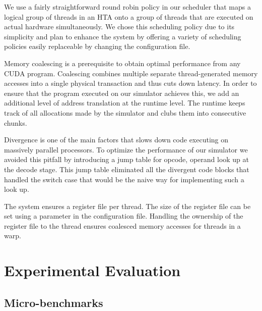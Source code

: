 \documentclass[conference, 10pt]{IEEEtran}
\begin{document}
We use a fairly straightforward round robin policy in our scheduler that maps a logical 
group of threads in an HTA onto a group of threads that are executed on actual hardware 
simultaneously. We chose this scheduling policy due to its simplicity and plan to 
enhance the system by offering a variety of scheduling policies easily replaceable 
by changing the configuration file.


Memory coalescing is a prerequisite to obtain optimal performance from any CUDA program.
Coalescing combines multiple separate thread-generated memory accesses into a single 
physical transaction and thus cuts down latency.
In order to ensure that the program executed on our simulator achieves this, we add 
an additional level of address translation at the runtime level. The runtime keeps 
track of all allocations made by the simulator and clubs them into consecutive chunks.

Divergence is one of the main factors that slows down code executing on  
massively parallel processors. To optimize the performance of our simulator we avoided 
this pitfall by introducing a jump table for opcode, operand look up at the decode stage.
This jump table eliminated all the divergent code blocks that handled the switch case 
that would be the naive way for implementing such a look up. 

The system ensures a register file per thread. The size of the register file can be 
set using a parameter in the configuration file. Handling the ownership of the register 
file to the thread ensures coalesced memory accesses for threads in a warp.


\section{Experimental Evaluation}

\subsection{Micro-benchmarks}
\end{document}
